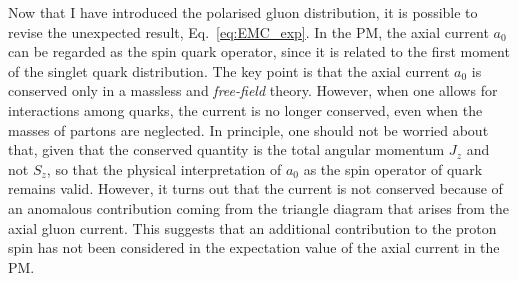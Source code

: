 Now that I have introduced the polarised gluon distribution, it is possible to revise the unexpected result, Eq.~\eqref{eq:EMC_exp}. In the PM, the axial current $a_0$ can be regarded as the spin quark operator, since it is related to the first moment of the singlet quark distribution. The key point is that the axial current $a_0$ is conserved only in a massless and \textit{free-field} theory. However, when one allows for interactions among quarks, the current is no longer conserved, even when the masses of partons are neglected. In principle, one should not be worried about that, given that the conserved quantity is the total angular momentum $J_z$ and not $S_z$, so that the physical interpretation of $a_0$ as the spin operator of quark remains valid. However, it turns out that the current is not conserved because of an anomalous contribution coming from the triangle diagram that arises from the axial gluon current. This suggests that an additional contribution to the proton spin has not been considered in the expectation value of the axial current in the PM.%

